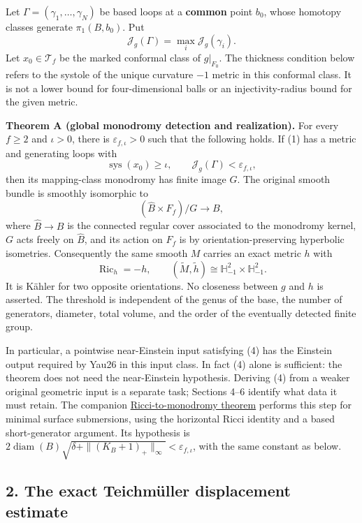 \documentclass[
  11pt,
]{article}
\begin{document}
Let \(\Gamma=(\gamma_1,\ldots,\gamma_N)\) be based loops at a
\textbf{common} point \(b_0\), whose homotopy classes generate
\(\pi_1(B,b_0)\). Put \[
                    \mathcal J_g(\Gamma)=\max_i\mathcal J_g(\gamma_i).
\tag{3}
\] Let \(x_0\in\mathcal T_f\) be the marked conformal class of
\(g|_{F_0}\). The thickness condition below refers to the systole of the
unique curvature \(-1\) metric in this conformal class. It is not a
lower bound for four-dimensional balls or an injectivity-radius bound
for the given metric.

\textbf{Theorem A (global monodromy detection and realization).} For
every \(f\ge2\) and \(\iota>0\), there is \(\varepsilon_{f,\iota}>0\)
such that the following holds. If (1) has a metric and generating loops
with \[
 \operatorname{sys}(x_0)\ge\iota,
 \qquad \mathcal J_g(\Gamma)<\varepsilon_{f,\iota},
\tag{4}
\] then its mapping-class monodromy has finite image \(G\). The original
smooth bundle is smoothly isomorphic to \[
                   (\widehat B\times F_f)/G\longrightarrow B,
\tag{5}
\] where \(\widehat B\to B\) is the connected regular cover associated
to the monodromy kernel, \(G\) acts freely on \(\widehat B\), and its
action on \(F_f\) is by orientation-preserving hyperbolic isometries.
Consequently the same smooth \(M\) carries an exact metric \(h\) with \[
                \operatorname{Ric}_h=-h,
       \qquad (\widetilde M,\widetilde h)
               \cong\mathbb H^2_{-1}\times\mathbb H^2_{-1}.
\tag{6}
\] It is Kähler for two opposite orientations. No closeness between
\(g\) and \(h\) is asserted. The threshold is independent of the genus
of the base, the number of generators, diameter, total volume, and the
order of the eventually detected finite group.

In particular, a pointwise near-Einstein input satisfying (4) has the
Einstein output required by Yau26 in this input class. In fact (4) alone
is sufficient: the theorem does not need the near-Einstein hypothesis.
Deriving (4) from a weaker original geometric input is a separate task;
Sections 4--6 identify what data it must retain. The companion
\href{20260924_ricci_monodromy_realization.md}{Ricci-to-monodromy
theorem} performs this step for minimal surface submersions, using the
horizontal Ricci identity and a based short-generator argument. Its
hypothesis is
\(2\operatorname{diam}(B)\sqrt{\delta+\|(K_B+1)_+\|_\infty} <\varepsilon_{f,\iota}\),
with the same constant as below.

\hypertarget{the-exact-teichmuxfcller-displacement-estimate}{%
\subsection{2. The exact Teichmüller displacement
estimate}\label{the-exact-teichmuxfcller-displacement-estimate}}
\end{document}
